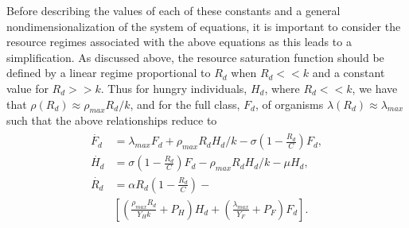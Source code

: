 \documentclass{pnastwo}
\begin{document}
\begin{article}
Before describing the values of each of these constants and a general nondimensionalization of the system of equations, it is important to consider the resource regimes associated with the above equations as this leads to a simplification. As discussed above, the resource saturation function should be defined by a linear regime proportional to $R_{d}$ when $R_{d}<<k$ and a constant value for $R_{d}>>k$. Thus for hungry individuals, $H_{d}$, where $R_{d}<<k$, we have that $\rho\left(R_{d}\right)\approx\rho_{max}R_{d}/k$, and for the full class, $F_{d}$, of organisms $\lambda\left(R_{d}\right)\approx\lambda_{max}$ such that the above relationships reduce to
\begin{align}
\begin{split}
\dot{F_{d}} &= \lambda_{max} F_{d} + \rho_{max}R_{d}H_{d}/k - \sigma \left(1-\frac{R_{d}}{C}\right)F_{d},  \\
\dot{H_{d}} &= \sigma \left(1-\frac{R_{d}}{C}\right)F_{d} - \rho_{max}R_{d} H_{d}/k - \mu H_{d},  \\
\dot{R_{d}} &= \alpha R_{d}\left(1-\frac{R_{d}}{C}\right) -\\
& \left[\left(\frac{\rho_{max}R_{d}}{Y_{H}k}+P_{H}\right)H_{d}+\left(\frac{\lambda_{max}}{Y_{F}}+P_{F}\right)F_{d}\right].
\end{split}
\end{align}


\end{article}
\end{document}
